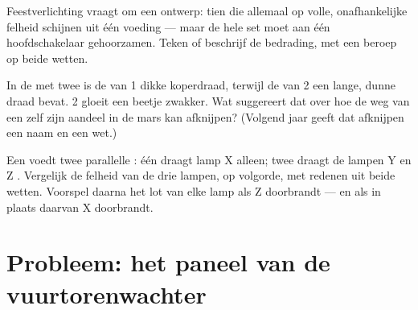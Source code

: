 \begin{exercise}[$\star\star$]\label{exo:g7:circuits-series-parallel:10}
Feestverlichting vraagt om een ontwerp: tien  die
allemaal op volle, onafhankelijke felheid schijnen uit één voeding ---
maar de hele set moet aan één hoofdschakelaar gehoorzamen. Teken of
beschrijf de bedrading, met een beroep op beide wetten.
\end{exercise}

\begin{exercise}[$\star\star$]\label{exo:g7:circuits-series-parallel:11}
In de  met twee  is de  van
 1 dikke koperdraad, terwijl de  van  2 een
lange, dunne draad bevat.  2 gloeit een beetje zwakker. Wat
suggereert dat over hoe de weg van een  zelf zijn aandeel in de
mars kan afknijpen? (Volgend jaar geeft dat afknijpen een naam en een
wet.)
\end{exercise}

\begin{exercise}[$\star\star\star$]\label{exo:g7:circuits-series-parallel:12}
Een  voedt twee parallelle :  één draagt
lamp X alleen;  twee draagt de lampen Y en Z .
Vergelijk de felheid van de drie lampen, op volgorde, met redenen uit
beide wetten. Voorspel daarna het lot van elke lamp als Z doorbrandt
--- en als in plaats daarvan X doorbrandt.
\end{exercise}

\section{Probleem: het paneel van de vuurtorenwachter}

